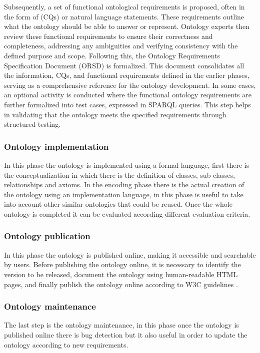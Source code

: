 Subsequently, a set of functional ontological requirements is proposed, often in the form of (CQs) or natural language statements.
These requirements outline what the ontology should be able to answer or represent. 
Ontology experts then review these functional requirements to ensure their correctness and completeness, addressing any ambiguities and verifying consistency with the defined purpose and scope.
Following this, the Ontology Requirements Specification Document (ORSD) is formalized.
This document consolidates all the information, CQs, and functional requirements defined in the earlier phases, serving as a comprehensive reference for the ontology development. 
In some cases, an optional activity is conducted where the functional ontology requirements are further formalized into test cases, expressed in SPARQL queries.
This step helps in validating that the ontology meets the specified requirements through structured testing.

\subsubsection{Ontology implementation}
In this phase the ontology is implemented using a formal language, first there is the conceptualization in which there is the definition of classes, sub-classes, relationships and axioms. 
In the encoding phase there is the actual creation of the ontology using an implementation language, in this phase is useful to take into account other similar ontologies that could be reused. Once the whole ontology is completed it can be evaluated according different evaluation criteria.

\subsubsection{Ontology publication}
In this phase the ontology is published online, making it accessible and searchable by users. 
Before publishing the ontology online, it is necessary to identify the version to be released, document the ontology using human-readable HTML pages, and finally publish the ontology online according to W3C guidelines \cite{ontology_online}.

\subsubsection{Ontology maintenance}
The last step is the ontology maintenance, in this phase once the ontology is published online there is bug detection but it also useful in order to update the ontology according to new requirements.

